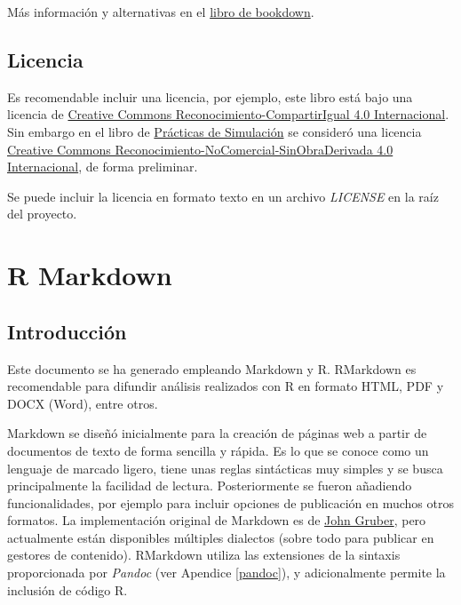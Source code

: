 \documentclass[
]{book}
\theoremstyle{definition}
\theoremstyle{definition}
\theoremstyle{definition}
\theoremstyle{definition}
\theoremstyle{remark}
\begin{document}
Más información y alternativas en el \href{https://bookdown.org/yihui/bookdown/publishing.html}{libro de bookdown}.

\hypertarget{licencia}{%
\section{Licencia}\label{licencia}}

Es recomendable incluir una licencia, por ejemplo, este libro está bajo una licencia de \href{https://creativecommons.org/licenses/by-sa/4.0/deed.es}{Creative Commons Reconocimiento-CompartirIgual 4.0 Internacional}.
Sin embargo en el libro de
\href{https://rubenfcasal.github.io/simbook}{Prácticas de Simulación}
se consideró una licencia
\href{https://creativecommons.org/licenses/by-nc-nd/4.0/deed.es_ES}{Creative Commons Reconocimiento-NoComercial-SinObraDerivada 4.0 Internacional},
de forma preliminar.

Se puede incluir la licencia en formato texto en un archivo \emph{LICENSE} en la raíz del proyecto.

\hypertarget{appendix-apuxe9ndices}{%
\appendix}


\hypertarget{rmarkdown}{%
\chapter{R Markdown}\label{rmarkdown}}

\hypertarget{introducciuxf3n-1}{%
\section{Introducción}\label{introducciuxf3n-1}}

Este documento se ha generado empleando Markdown y R.
RMarkdown es recomendable para difundir análisis realizados con R en formato
HTML, PDF y DOCX (Word), entre otros.

Markdown se diseñó inicialmente para la creación de páginas web a partir de documentos de texto
de forma sencilla y rápida.
Es lo que se conoce como un lenguaje de marcado ligero, tiene unas reglas sintácticas muy simples
y se busca principalmente la facilidad de lectura.
Posteriormente se fueron añadiendo funcionalidades,
por ejemplo para incluir opciones de publicación en muchos otros formatos.
La implementación original de Markdown es de
\href{http://daringfireball.net/projects/markdown/}{John Gruber},
pero actualmente están disponibles múltiples dialectos
(sobre todo para publicar en gestores de contenido).
RMarkdown utiliza las extensiones de la sintaxis proporcionada por \emph{Pandoc} (ver Apendice \ref{pandoc}),
y adicionalmente permite la inclusión de código R.
\end{document}

